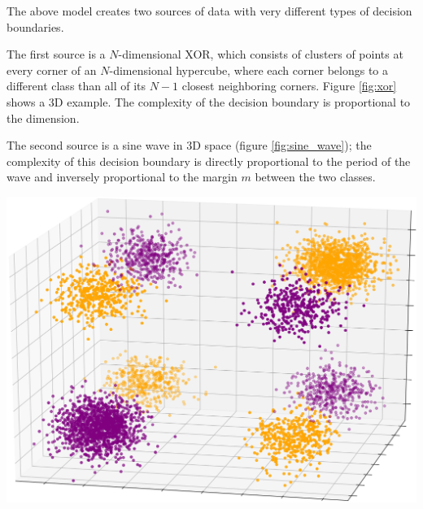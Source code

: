 \documentclass{article}
\begin{document}
The above model creates two sources of data with very different types of
decision boundaries.

The first source is a $N$-dimensional XOR, which consists of clusters of points
at every corner of an $N$-dimensional hypercube, where each corner belongs to a
different class than all of its $N-1$ closest neighboring corners. Figure
\ref{fig:xor} shows a 3D example. The complexity of the decision boundary is
proportional to the dimension.

The second source is a sine wave in 3D space (figure \ref{fig:sine_wave}); the
complexity of this decision boundary is directly proportional to the period of
the wave and inversely proportional to the margin $m$ between the two classes.

\begin{minipage}{\textwidth}
\begin{minipage}{.48\textwidth}
    \centering
    \includegraphics[width=\textwidth]{xor_3d_square.png}
    \label{fig:xor}
\end{minipage}
\hspace{.04\textwidth}
\begin{minipage}{.48\textwidth}
    \centering

\end{minipage}
\end{minipage}
\end{document}
